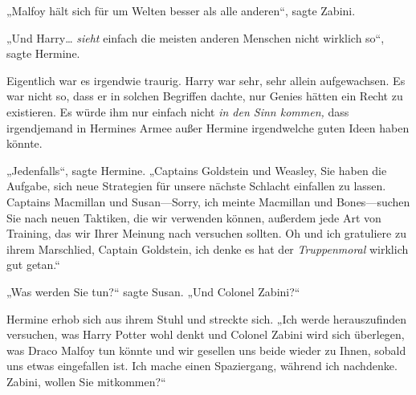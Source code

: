 „Malfoy hält sich für um Welten besser als alle anderen“, sagte Zabini.

„Und Harry… \emph{sieht} einfach die meisten anderen Menschen nicht wirklich so“, sagte Hermine.

Eigentlich war es irgendwie traurig. Harry war sehr, sehr allein aufgewachsen. Es war nicht so, dass er in solchen Begriffen dachte, nur Genies hätten ein Recht zu existieren. Es würde ihm nur einfach nicht \emph{in den Sinn kommen,} dass irgendjemand in Hermines Armee außer Hermine irgendwelche guten Ideen haben könnte.

„Jedenfalls“, sagte Hermine. „Captains Goldstein und Weasley, Sie haben die Aufgabe, sich neue Strategien für unsere nächste Schlacht einfallen zu lassen. Captains Macmillan und Susan—Sorry, ich meinte Macmillan und Bones—suchen Sie nach neuen Taktiken, die wir verwenden können, außerdem jede Art von Training, das wir Ihrer Meinung nach versuchen sollten. Oh und ich gratuliere zu ihrem Marschlied, Captain Goldstein, ich denke es hat der \emph{Truppenmoral} wirklich gut getan.“

„Was werden Sie tun?“ sagte Susan. „Und Colonel Zabini?“

Hermine erhob sich aus ihrem Stuhl und streckte sich. „Ich werde herauszufinden versuchen, was Harry Potter wohl denkt und Colonel Zabini wird sich überlegen, was Draco Malfoy tun könnte und wir gesellen uns beide wieder zu Ihnen, sobald uns etwas eingefallen ist. Ich mache einen Spaziergang, während ich nachdenke. Zabini, wollen Sie mitkommen?“

